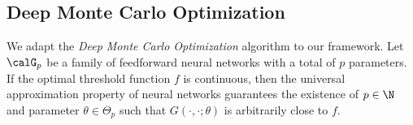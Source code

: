


\subsection{Deep Monte Carlo Optimization} \label{sec:DMCO}
We adapt the \textit{Deep Monte Carlo Optimization} algorithm \cite{HanJentzenE} to our framework. Let $\calG_p$ be a family of feedforward neural networks  with a total of $p$ parameters. If the optimal threshold function $f$ is continuous, then the universal approximation property of neural networks  \cite{Cybenko,Hornik} guarantees the existence of $p\in \N$ and parameter $\theta \in \Theta_p$ such that $G(\cdot,\cdot;\theta)$ is arbitrarily close to $f$.  %

